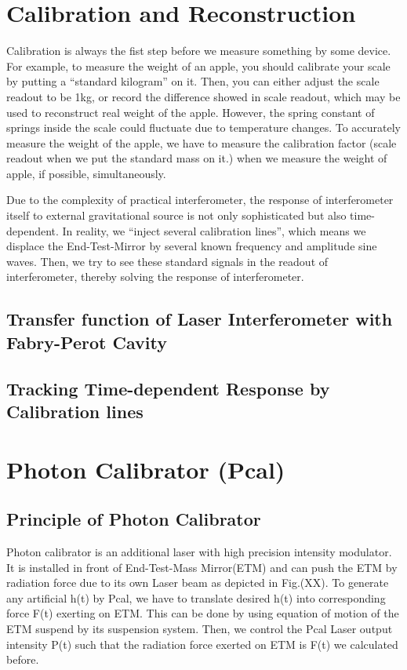 \section{Calibration and Reconstruction}

Calibration is always the fist step before we measure something by some device.
For example, to measure the weight of an apple, you should calibrate your scale by putting a “standard kilogram” on it. Then, you can either adjust the scale readout to be 1kg, or record the difference showed in scale readout, which may be used to reconstruct real weight of the apple. However, the spring constant of springs inside the scale could fluctuate due to temperature changes. To accurately measure the weight of the apple, we have to measure the calibration factor (scale readout when we put the standard mass on it.) when we measure the weight of apple, if possible, simultaneously.

Due to the complexity of practical interferometer, the response of interferometer itself to external gravitational source is not only sophisticated but also time-dependent. In reality, we “inject several calibration lines”, which means we displace the End-Test-Mirror by several known frequency and amplitude sine waves. Then, we try to see these standard signals in the readout of interferometer, thereby solving the response of interferometer.

\subsection{Transfer function of Laser Interferometer with Fabry-Perot Cavity}


\subsection{Tracking Time-dependent Response by Calibration lines}



\section{Photon Calibrator (Pcal)}
\subsection{Principle of Photon Calibrator}
Photon calibrator is an additional laser with high precision intensity modulator. It is installed in front of End-Test-Mass Mirror(ETM) and can push the ETM by radiation force due to its own Laser beam as depicted in Fig.(XX). To generate any artificial h(t) by Pcal, we have to translate desired h(t) into corresponding force F(t) exerting on ETM. This can be done by using equation of motion of the ETM suspend by its suspension system. Then, we control the Pcal Laser output intensity P(t) such that the radiation force exerted on ETM is F(t) we calculated before. 

